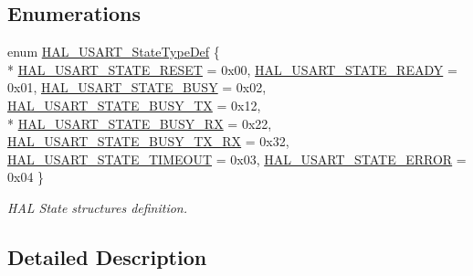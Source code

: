 \subsection*{Enumerations}
\begin{DoxyCompactItemize}
\item 
enum \hyperlink{group___u_s_a_r_t___exported___types_ga502e7abdfa6b24f0f6b40cf60c7383c5}{H\+A\+L\+\_\+\+U\+S\+A\+R\+T\+\_\+\+State\+Type\+Def} \{ \\*
\hyperlink{group___u_s_a_r_t___exported___types_gga502e7abdfa6b24f0f6b40cf60c7383c5ab78adc4ded45529f2cf9e74150e49696}{H\+A\+L\+\_\+\+U\+S\+A\+R\+T\+\_\+\+S\+T\+A\+T\+E\+\_\+\+R\+E\+S\+ET} = 0x00, 
\hyperlink{group___u_s_a_r_t___exported___types_gga502e7abdfa6b24f0f6b40cf60c7383c5ac707f3dc06c16fce84d167b03441e3d1}{H\+A\+L\+\_\+\+U\+S\+A\+R\+T\+\_\+\+S\+T\+A\+T\+E\+\_\+\+R\+E\+A\+DY} = 0x01, 
\hyperlink{group___u_s_a_r_t___exported___types_gga502e7abdfa6b24f0f6b40cf60c7383c5af29d38beb8203761692149ce14a9cbdb}{H\+A\+L\+\_\+\+U\+S\+A\+R\+T\+\_\+\+S\+T\+A\+T\+E\+\_\+\+B\+U\+SY} = 0x02, 
\hyperlink{group___u_s_a_r_t___exported___types_gga502e7abdfa6b24f0f6b40cf60c7383c5a2ee8ab5e15829c484ab4c4fbec68d3f6}{H\+A\+L\+\_\+\+U\+S\+A\+R\+T\+\_\+\+S\+T\+A\+T\+E\+\_\+\+B\+U\+S\+Y\+\_\+\+TX} = 0x12, 
\\*
\hyperlink{group___u_s_a_r_t___exported___types_gga502e7abdfa6b24f0f6b40cf60c7383c5a4943f2dd7af684bfad7688b16e149f0d}{H\+A\+L\+\_\+\+U\+S\+A\+R\+T\+\_\+\+S\+T\+A\+T\+E\+\_\+\+B\+U\+S\+Y\+\_\+\+RX} = 0x22, 
\hyperlink{group___u_s_a_r_t___exported___types_gga502e7abdfa6b24f0f6b40cf60c7383c5aab5458c5e3bf1fbd3065ef8fb0109e63}{H\+A\+L\+\_\+\+U\+S\+A\+R\+T\+\_\+\+S\+T\+A\+T\+E\+\_\+\+B\+U\+S\+Y\+\_\+\+T\+X\+\_\+\+RX} = 0x32, 
\hyperlink{group___u_s_a_r_t___exported___types_gga502e7abdfa6b24f0f6b40cf60c7383c5a7e3fd9d81ea140c60b8ace92fa0efb06}{H\+A\+L\+\_\+\+U\+S\+A\+R\+T\+\_\+\+S\+T\+A\+T\+E\+\_\+\+T\+I\+M\+E\+O\+UT} = 0x03, 
\hyperlink{group___u_s_a_r_t___exported___types_gga502e7abdfa6b24f0f6b40cf60c7383c5a3bd9b34183b2942ab9b8bb8e9f2beb13}{H\+A\+L\+\_\+\+U\+S\+A\+R\+T\+\_\+\+S\+T\+A\+T\+E\+\_\+\+E\+R\+R\+OR} = 0x04
 \}\begin{DoxyCompactList}\small\item\em H\+AL State structures definition. \end{DoxyCompactList}
\end{DoxyCompactItemize}


\subsection{Detailed Description}


